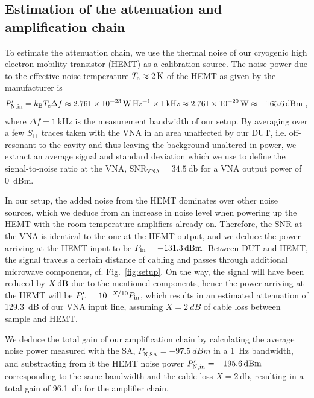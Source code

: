 \subsection{Estimation of the attenuation and amplification chain}\label{sec:attenuation}

To estimate the attenuation chain, we use the thermal noise of our cryogenic high electron mobility transistor (HEMT) as a calibration source.
% 
The noise power due to the effective noise temperature $T_{\rm e}\approx2{\,\rm K}$ of the HEMT as given by the manufacturer is
% 
\begin{align}
P_{\rm N,in}^\prime=k_{\rm B}T_{\rm e}\Delta f \approx \SI{2.761e-23}{\watt\per\hertz} \times \SI{1}{\kilo\hertz} \approx \SI{2.761e-20}{\watt} \approx \SI{-165.6}{dBm}\ ,
\label{eq:HEMTnoise}
\end{align}
% 
where $\Delta f=\SI{1}{\kilo\hertz}$ is the measurement bandwidth of our setup.
% 
By averaging over a few $S_{11}$ traces taken with the VNA in an area unaffected by our DUT, i.e. off-resonant to the cavity and thus leaving the background unaltered in power, we extract an average signal and standard deviation which we use to define the signal-to-noise ratio at the VNA, $\text{SNR}_\text{VNA}=\SI{34.5}{\decibel}$ for a VNA output power of \SI{0}{dBm}.

In our setup, the added noise from the HEMT dominates over other noise sources, which we deduce from an increase in noise level when powering up the HEMT with the room temperature amplifiers already on.
% 
Therefore, the SNR at the VNA is identical to the one at the HEMT output, and we deduce the power arriving at the HEMT input to be $P_{\rm in}=\SI{-131.3}{dBm}$. 
% 
Between DUT and HEMT, the signal travels a certain distance of cabling and passes through additional microwave components, cf. Fig.~\ref{fig:setup}.
% 
On the way, the signal will have been reduced by $X {\,\rm dB}$ due to the mentioned components, hence the power arriving at the HEMT will be $P_{\rm in}^\prime = 10^{-X/10} P_{\rm in}$, which results in an estimated attenuation of \SI{129.3}{dB} of our VNA input line, assuming $X=\SI{2}{dB}$ of cable loss between sample and HEMT.

We deduce the total gain of our amplification chain by calculating the average noise power measured with the SA, $P_\text{N,SA}=\SI{-97.5}{dBm}$ in a \SI{1}{\hertz} bandwidth, and substracting from it the HEMT noise power $P_{\rm N,in}^\prime=\SI{-195.6}{dBm}$ corresponding to the same bandwidth and the cable loss $X=\SI{2}{\decibel}$, resulting in a total gain of \SI{96.1}{\decibel} for the amplifier chain.

